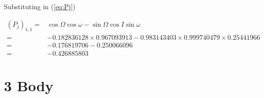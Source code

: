 \documentclass[]{article}
\begin{document}
Substituting in (\ref{eq:Pj})

\begin{align*}
(P_j)_{1,1} =& \cos \Omega \cos \omega - \sin \Omega \cos I \sin \omega \\
=& -0.182836128 \times 	0.967093913 - 0.983143403 \times 0.999740479 \times 	0.25441966\\
=& -0.176819706 - 0.250066096\\
=& -0.426885803
\end{align*}

\section {3 Body}



\end{document}
